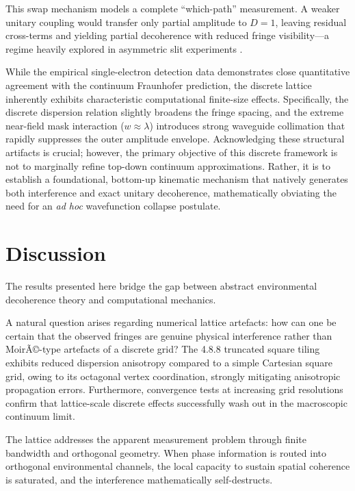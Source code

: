 \documentclass[submission, Phys]{SciPost}
\begin{document}
This swap mechanism models a complete ``which-path'' measurement. A weaker unitary coupling would transfer only partial amplitude to $D=1$, leaving residual cross-terms and yielding partial decoherence with reduced fringe visibility---a regime heavily explored in asymmetric slit experiments \cite{harada2018}.

While the empirical single-electron detection data demonstrates close quantitative agreement with the continuum Fraunhofer prediction, the discrete lattice inherently exhibits characteristic computational finite-size effects. Specifically, the discrete dispersion relation slightly broadens the fringe spacing, and the extreme near-field mask interaction ($w \approx \lambda$) introduces strong waveguide collimation that rapidly suppresses the outer amplitude envelope. Acknowledging these structural artifacts is crucial; however, the primary objective of this discrete framework is not to marginally refine top-down continuum approximations. Rather, it is to establish a foundational, bottom-up kinematic mechanism that natively generates both interference and exact unitary decoherence, mathematically obviating the need for an \textit{ad hoc} wavefunction collapse postulate.

\section{Discussion}
\label{sec:discussion}
The results presented here bridge the gap between abstract environmental decoherence theory \cite{zeh1970, zurek2009} and computational mechanics. 

A natural question arises regarding numerical lattice artefacts: how can one be certain that the observed fringes are genuine physical interference rather than MoirÃ©-type artefacts of a discrete grid? The 4.8.8 truncated square tiling exhibits reduced dispersion anisotropy compared to a simple Cartesian square grid, owing to its octagonal vertex coordination, strongly mitigating anisotropic propagation errors. Furthermore, convergence tests at increasing grid resolutions confirm that lattice-scale discrete effects successfully wash out in the macroscopic continuum limit.

The lattice addresses the apparent measurement problem through finite bandwidth and orthogonal geometry. When phase information is routed into orthogonal environmental channels, the local capacity to sustain spatial coherence is saturated, and the interference mathematically self-destructs. 
\end{document}

